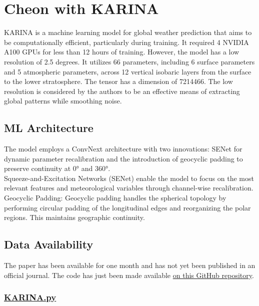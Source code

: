 \section{Cheon with KARINA}

KARINA is a machine learning model for global weather prediction that aims to be computationally efficient, particularly during training. It required 4 NVIDIA A100 GPUs for less than 12 hours of training. However, the model has a low resolution of 2.5 degrees. It utilizes 66 parameters, including 6 surface parameters and 5 atmospheric parameters, across 12 vertical isobaric layers from the surface to the lower stratosphere. The tensor has a dimension of 7214466. The low resolution is considered by the authors to be an effective means of extracting global patterns while smoothing noise.\\

\subsection{ML Architecture}

The model employs a ConvNext architecture with two innovations: SENet for dynamic parameter recalibration and the introduction of geocyclic padding to preserve continuity at 0° and 360°.\\

Squeeze-and-Excitation Networks (SENet) enable the model to focus on the most relevant features and meteorological variables through channel-wise recalibration.\\

Geocyclic Padding: Geocyclic padding handles the spherical topology by performing circular padding of the longitudinal edges and reorganizing the polar regions. This maintains geographic continuity.\\

\subsection{Data Availability}

The paper has been available for one month and has not yet been published in an official journal. The code has just been made available \href{https://github.com/jmj2316/KARINA/}{on this GitHub repository}.\\

\subsubsection{\href{https://github.com/jmj2316/KARINA/blob/main/networks/karina.py}{KARINA.py}}

